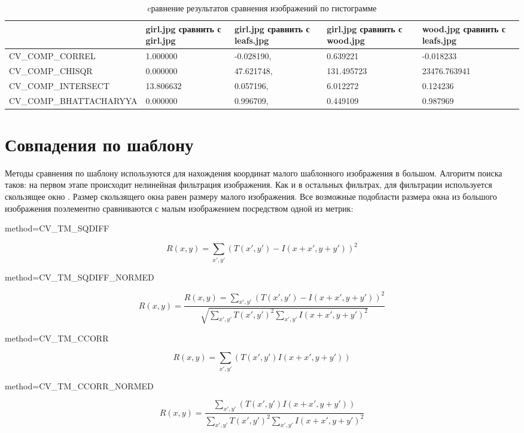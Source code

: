 \documentclass[oneside,final,14pt]{extreport}
\begin{document}
\begin{table}[H] 
\caption{cравнение результатов сравнения изображений по гистограмме}
\label{hist:comparison}
\begin{tabularx}{\textwidth}{|X|X|X|X|X|}
\hline
 & 
girl.jpg сравнить с girl.jpg
&
girl.jpg сравнить с leafs.jpg
&
girl.jpg сравнить с wood.jpg
&
wood.jpg сравнить с leafs.jpg
\\
\hline
CV\_\allowbreak COMP\_\allowbreak CORREL
&
 1.000000
& 
 -0.028190, 
&
0.639221
&
-0.018233
\\
\hline
CV\_\allowbreak COMP\_\allowbreak CHISQR
&
0.000000
&
 47.621748, 
&
131.495723
&
23476.763941
\\
\hline
CV\_\allowbreak COMP\_\allowbreak INTERSECT
&
13.806632
&
0.057196, 
&
6.012272
&
 0.124236
\\
\hline
CV\_\allowbreak COMP\_\allowbreak BHATTA\allowbreak CHARYYA
&
 0.000000
&
0.996709, 
&
0.449109
&
0.987969
\\
\hline
\end{tabularx}
\end{table}

\section{Совпадения по шаблону}
Методы сравнения по шаблону используются для нахождения координат малого шаблонного изображения в большом. Алгоритм поиска таков:
на первом этапе происходит нелинейная фильтрация изображения. Как и в остальных фильтрах, для фильтрации используется скользящее окно \cite{Dup:coursache}. Размер скользящего окна равен размеру малого изображения. Все возможные подобласти размера окна  из большого изображения поэлементно сравниваются с малым изображением посредством одной из метрик:   

\newpage
 method=CV\_TM\_SQDIFF

$$
R(x,y)
=
\sum_{x',y'}
(T(x',y')-I(x+x',y+y'))^2
$$ 

method=CV\_TM\_SQDIFF\_NORMED

$$
R(x,y)
=
\frac{
R(x,y)
=
\sum_{x',y'}
(T(x',y')-I(x+x',y+y'))^2
}
{
\sqrt{
	\sum_{x',y'}
	T(x',y')^2
	\sum_{x',y'}
	I(x+x',y+y')^2
	}
}
$$

method=CV\_TM\_CCORR

$$
R(x,y)
=
\sum_{x',y'}
( T(x',y')I(x+x',y+y'))
$$

method=CV\_TM\_CCORR\_NORMED

$$
R(x,y)
=
\frac{
	\sum_{x',y'}
	( T(x',y')I(x+x',y+y'))
}
{
	\sum_{x',y'}
	T(x',y')^2
	\sum_{x',y'}
	I(x+x',y+y')^2
}
$$
\end{document}
